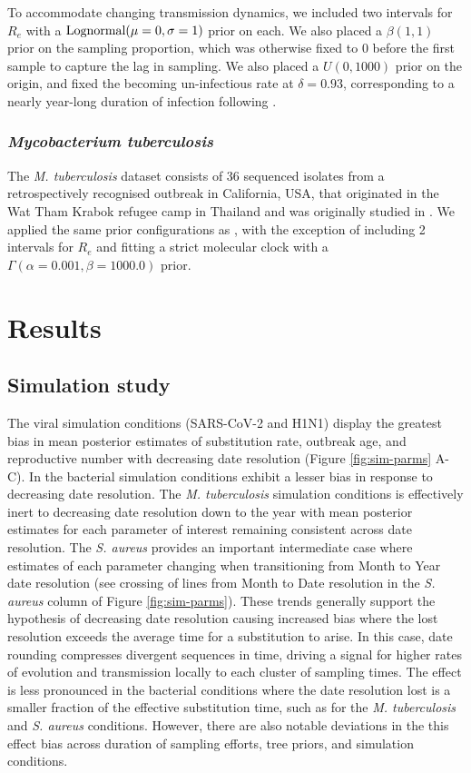 \documentclass{article}
\begin{document}
\begin{spacing}{1.5}
To accommodate changing transmission dynamics, we included two intervals for $R_e$ with a $\textnormal{Lognormal}(\mu=0,\sigma=1)$ prior on each. We also placed a $\beta(1,1)$ prior on the sampling proportion, which was otherwise fixed to 0 before the first sample to capture the lag in sampling. We also placed a $U(0,1000)$ prior on the origin, and fixed the becoming un-infectious rate at $\delta=0.93$, corresponding to a nearly year-long duration of infection following \citet{volz_modeling_2018}.

\subsubsection*{\textit{Mycobacterium tuberculosis}}
The \textit{M. tuberculosis} dataset consists of 36 sequenced isolates from a retrospectively recognised outbreak in California, USA, that originated in the Wat Tham Krabok refugee camp in Thailand and was originally studied in \citet{kuhnert_tuberculosis_2018}. We applied the same prior configurations as \citet{kuhnert_tuberculosis_2018}, with the exception of including 2 intervals for $R_e$ and fitting a strict molecular clock with a $\Gamma(\alpha=0.001,\beta=1000.0)$ prior.

\section*{Results}
\subsection*{Simulation study}
The viral simulation conditions (SARS-CoV-2 and H1N1) display the greatest bias in mean posterior estimates of substitution rate, outbreak age, and reproductive number with decreasing date resolution (Figure \ref{fig:sim-parms} A-C). In the bacterial simulation conditions exhibit a lesser bias in response to decreasing date resolution. The \textit{M. tuberculosis} simulation conditions is effectively inert to decreasing date resolution down to the year with mean posterior estimates for each parameter of interest remaining consistent across date resolution. The \textit{S. aureus} provides an important intermediate case where estimates of each parameter changing when transitioning from Month to Year date resolution (see crossing of lines from Month to Date resolution in the \textit{S. aureus} column of Figure \ref{fig:sim-parms}). These trends generally support the hypothesis of decreasing date resolution causing increased bias where the lost resolution exceeds the average time for a substitution to arise. In this case, date rounding compresses divergent sequences in time, driving a signal for higher rates of evolution and transmission locally to each cluster of sampling times.  The effect is less pronounced in the bacterial conditions where the date resolution lost is a smaller fraction of the effective substitution time, such as for the \textit{M. tuberculosis} and \textit{S. aureus} conditions.  However, there are also notable deviations in the this effect bias across duration of sampling efforts, tree priors, and simulation conditions.


\end{spacing}
\end{document}
